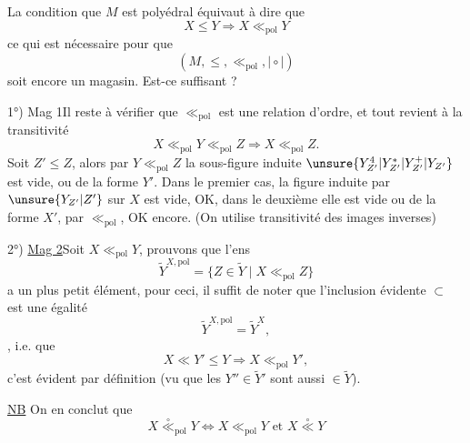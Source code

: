 La condition que $M$ est polyédral  équivaut à dire que
\[
X\leq Y\Longrightarrow X\ll_{\mathrm{pol}}Y
\]
ce qui est nécessaire pour que
\[
(M,\leq,\ll_{\mathrm{pol}},\mid\circ\mid)
\]
soit encore un magasin. Est-ce suffisant ?

1°) Mag 1\quad Il reste à vérifier que $\ll_{\mathrm{pol}}$ est une relation d'ordre, et tout revient à la transitivité
\[
X\ll_{\mathrm{pol}}Y\ll_{\mathrm{pol}}Z\Longrightarrow X\ll_{\mathrm{pol}}Z.
\]
Soit $Z'\leq Z$, alors par $Y\ll_{\mathrm{pol}}Z$  la sous-figure induite $\unsure{Y^{4}_{Z'}|Y^{*}_{Z'}|Y^{+}_{Z'}|Y_{Z'}}$ est vide, ou de la forme $Y'$. Dans le premier cas, la figure induite par $\unsure{Y_{Z'}|Z'}$ sur $X$ est vide, OK, dans le deuxième elle est vide ou de la forme $X'$, par $\ll_{\mathrm{pol}}$, OK encore. (On utilise transitivité des images inverses)

2°) \uline{Mag 2}\quad Soit $X\ll_{\mathrm{pol}}Y$, prouvons que l'ens
\[
\widetilde{Y}^{X,\mathrm{pol}}=\{Z\in\widetilde{Y}\mid X\ll_{\mathrm{pol}}Z\}
\]
a un plus petit élément, pour ceci, il suffit de noter que l'inclusion évidente $\subset$ est une égalité
\[
\widetilde{Y}^{X,\mathrm{pol}}=\widetilde{Y}^{X},
\]
,
i.e. que 
\[
X\ll Y'\leq Y\Longrightarrow X\ll_{\mathrm{pol}}Y',
\]
c'est évident par définition (vu que les $Y''\in\widetilde{Y}'$ sont aussi $\in\widetilde{Y}$).

 \uline{NB} On en conclut que
\[
X\overset{\circ}{\ll}_{\mathrm{pol}}Y\Longleftrightarrow X\ll_{\mathrm{pol}}Y\text{ et }X\overset{\circ}{\ll}Y
\]
